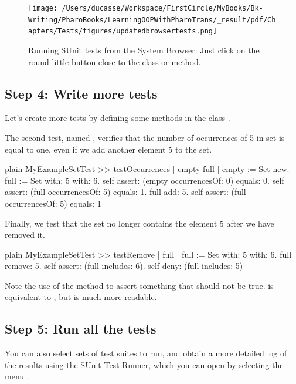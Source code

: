 \documentclass[10pt,twoside,english]{_support/latex/sbabook/sbabook}
\begin{document}
\begin{figure}

\begin{center}
\texttt{[image: /Users/ducasse/Workspace/FirstCircle/MyBooks/Bk-Writing/PharoBooks/LearningOOPWithPharoTrans/\_result/pdf/Chapters/Tests/figures/updatedbrowsertests.png]}\caption{Running SUnit tests from the System Browser: Just click on the round little button close to the class or method.\label{fig:browsertests}}\end{center}
\end{figure}

\subsection{Step 4: Write more tests}
Let's create more tests by defining some methods in the class
.

The second test, named , verifies that the
number of occurrences of 5 in  set is equal to one, even if we
add another element 5 to the set.

\begin{displaycode}{plain}
MyExampleSetTest >> testOccurrences
	| empty full |
	empty := Set new.
	full := Set with: 5 with: 6.
	self assert: (empty occurrencesOf: 0) equals: 0.
	self assert: (full occurrencesOf: 5) equals: 1.
	full add: 5.
	self assert: (full occurrencesOf: 5) equals: 1
\end{displaycode}

Finally, we test that the set no longer contains the element 5 after we have
removed it.

\begin{displaycode}{plain}
MyExampleSetTest >> testRemove
	| full |
	full := Set with: 5 with: 6.
	full remove: 5.
	self assert: (full includes: 6).
	self deny: (full includes: 5)
\end{displaycode}

Note the use of the method  to assert something that should
not be true.  is equivalent to
, but is much more readable.
\subsection{Step 5: Run all the tests}
You can also select sets of test suites to run, and obtain a more detailed log
of the results using the SUnit Test Runner, which you can open by selecting the menu
.
\end{document}
